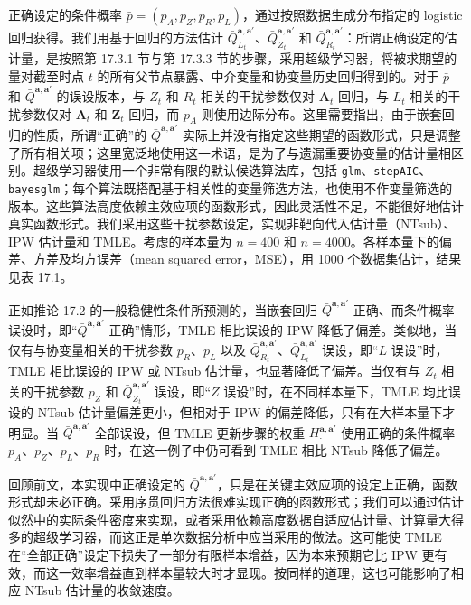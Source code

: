 正确设定的条件概率 $\bar p=(p_A,p_Z,p_R,p_L)$，通过按照数据生成分布指定的 logistic 回归获得。我们用基于回归的方法估计 $\bar Q_{L_t}^{\mathbf a,\mathbf a'}$、$\bar Q_{Z_t}^{\mathbf a,\mathbf a'}$ 和 $\bar Q_{R_t}^{\mathbf a,\mathbf a'}$：所谓正确设定的估计量，是按照第 17.3.1 节与第 17.3.3 节的步骤，采用超级学习器，将被求期望的量对截至时点 $t$ 的所有父节点暴露、中介变量和协变量历史回归得到的。对于 $\bar p$ 和 $\bar Q^{\mathbf a,\mathbf a'}$ 的误设版本，与 $Z_t$ 和 $R_t$ 相关的干扰参数仅对 $\mathbf A_t$ 回归，与 $L_t$ 相关的干扰参数仅对 $\mathbf A_t$ 和 $\mathbf Z_t$ 回归，而 $p_A$ 则使用边际分布。这里需要指出，由于嵌套回归的性质，所谓“正确”的 $\bar Q^{\mathbf a,\mathbf a'}$ 实际上并没有指定这些期望的函数形式，只是调整了所有相关项；这里宽泛地使用这一术语，是为了与遗漏重要协变量的估计量相区别。超级学习器使用一个非常有限的默认候选算法库，包括 \texttt{glm}、\texttt{stepAIC}、\texttt{bayesglm}；每个算法既搭配基于相关性的变量筛选方法，也使用不作变量筛选的版本。这些算法高度依赖主效应项的函数形式，因此灵活性不足，不能很好地估计真实函数形式。我们采用这些干扰参数设定，实现非靶向代入估计量（NTsub）、IPW 估计量和 TMLE。考虑的样本量为 $n=400$ 和 $n=4000$。各样本量下的偏差、方差及均方误差（mean squared error，MSE），用 1000 个数据集估计，结果见表 17.1。

正如推论 17.2 的一般稳健性条件所预测的，当嵌套回归 $\bar Q^{\mathbf a,\mathbf a'}$ 正确、而条件概率误设时，即“$\bar Q^{\mathbf a,\mathbf a'}$ 正确”情形，TMLE 相比误设的 IPW 降低了偏差。类似地，当仅有与协变量相关的干扰参数 $p_R$、$p_L$ 以及 $\bar Q_{R_t}^{\mathbf a,\mathbf a'}$、$\bar Q_{L_t}^{\mathbf a,\mathbf a'}$ 误设，即“$L$ 误设”时，TMLE 相比误设的 IPW 或 NTsub 估计量，也显著降低了偏差。当仅有与 $Z_t$ 相关的干扰参数 $p_Z$ 和 $\bar Q_{Z_t}^{\mathbf a,\mathbf a'}$ 误设，即“$Z$ 误设”时，在不同样本量下，TMLE 均比误设的 NTsub 估计量偏差更小，但相对于 IPW 的偏差降低，只有在大样本量下才明显。当 $\bar Q^{\mathbf a,\mathbf a'}$ 全部误设，但 TMLE 更新步骤的权重 $H_{\cdot}^{\mathbf a,\mathbf a'}$ 使用正确的条件概率 $p_A$、$p_Z$、$p_L$、$p_R$ 时，在这一例子中仍可看到 TMLE 相比 NTsub 降低了偏差。

回顾前文，本实现中正确设定的 $\bar Q^{\mathbf a,\mathbf a'}$，只是在关键主效应项的设定上正确，函数形式却未必正确。采用序贯回归方法很难实现正确的函数形式；我们可以通过估计似然中的实际条件密度来实现，或者采用依赖高度数据自适应估计量、计算量大得多的超级学习器，而这正是单次数据分析中应当采用的做法。这可能使 TMLE 在“全部正确”设定下损失了一部分有限样本增益，因为本来预期它比 IPW 更有效，而这一效率增益直到样本量较大时才显现。按同样的道理，这也可能影响了相应 NTsub 估计量的收敛速度。

